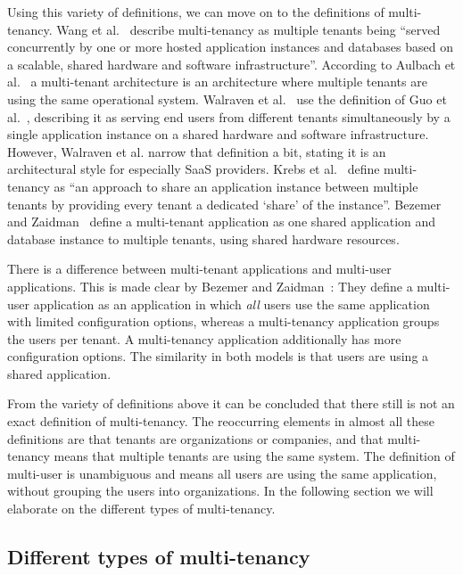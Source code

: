 Using this variety of definitions, we can move on to the definitions of multi-tenancy. Wang et al.~\cite{wang2008study} describe multi-tenancy as multiple tenants being ``served concurrently by one or more hosted application instances and databases based on a scalable, shared hardware and software infrastructure''. According to Aulbach et al.~\cite{aulbach2008multi} a multi-tenant architecture is an architecture where multiple tenants are using the same operational system. Walraven et al.~\cite{walraven2012towards} use the definition of Guo et al.~\cite{guo2007framework}, describing it as serving end users from different tenants simultaneously by a single application instance on a shared hardware and software infrastructure. However, Walraven et al. narrow that definition a bit, stating it is an architectural style for especially \ac{SaaS} providers. Krebs et al.~\cite{krebs2012architecture} define multi-tenancy as ``an approach to share an application instance between multiple tenants by providing every tenant a dedicated `share' of the instance''. Bezemer and Zaidman~\cite{bezemer2010multi} define a multi-tenant application as one shared application and database instance to multiple tenants, using shared hardware resources.

There is a difference between multi-tenant applications and multi-user applications. This is made clear by Bezemer and Zaidman~\cite{bezemer2010multi}: They define a multi-user application as an application in which \emph{all} users use the same application with limited configuration options, whereas a multi-tenancy application groups the users per tenant. A multi-tenancy application additionally has more configuration options. The similarity in both models is that users are using a shared application. %

From the variety of definitions above it can be concluded that there still is not an exact definition of multi-tenancy. The reoccurring elements in almost all these definitions are that tenants are organizations or companies, and that multi-tenancy means that multiple tenants are using the same system. The definition of multi-user is unambiguous and means all users are using the same application, without grouping the users into organizations. In the following section we will elaborate on the different types of multi-tenancy. 

\subsection{Different types of multi-tenancy}

